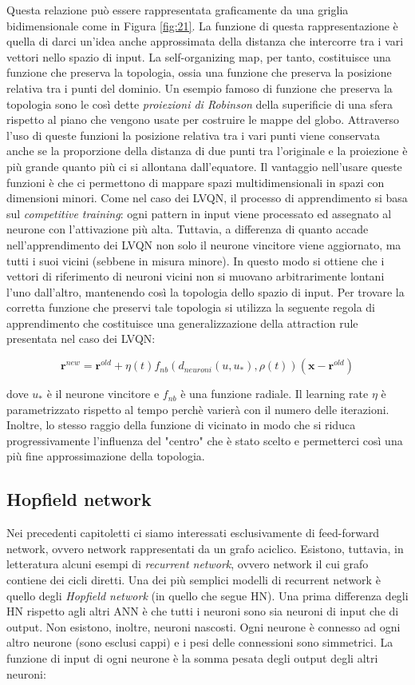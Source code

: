 \documentclass[10pt,a4paper]{article}
\begin{document}
Questa relazione può essere rappresentata graficamente da una griglia bidimensionale come in Figura  \ref{fig:21}. La funzione di questa rappresentazione è quella di darci un'idea anche approssimata della distanza che intercorre tra i vari vettori nello spazio di input. La self-organizing map, per tanto, costituisce una funzione che preserva la topologia, ossia una funzione che preserva la posizione relativa tra i punti del dominio. Un esempio famoso di funzione che preserva la topologia sono le così dette \emph{proiezioni di Robinson} della superificie di una sfera rispetto al piano che vengono usate per costruire le mappe del globo. Attraverso l'uso di queste funzioni la posizione relativa tra i vari punti viene conservata anche se la proporzione della distanza di due punti tra l'originale e la proiezione è più grande quanto più ci si allontana dall'equatore. Il vantaggio nell'usare queste funzioni è che ci permettono di mappare spazi multidimensionali in spazi con dimensioni minori. Come nel caso dei LVQN, il processo di apprendimento si basa sul \emph{competitive training}: ogni pattern in input viene processato ed assegnato al neurone con l'attivazione più alta. Tuttavia, a differenza di quanto accade nell'apprendimento dei LVQN non solo il neurone vincitore viene aggiornato, ma tutti i suoi vicini (sebbene in misura minore). In questo modo si ottiene che i vettori di riferimento di neuroni vicini non si muovano arbitrarimente lontani l'uno dall'altro, mantenendo così la topologia dello spazio di input. Per trovare la corretta funzione che preservi tale topologia si utilizza la seguente regola di apprendimento che costituisce una generalizzazione della attraction rule presentata nel caso dei LVQN:

$$
\mathbf{r}^{new} = \mathbf{r}^{old} + \eta(t)f_{nb}(d_{neuroni}(u,u_*),\rho(t))(\mathbf{x} - \mathbf{r}^{old})
$$

dove $u_*$ è il neurone vincitore e $f_{nb}$ è una funzione radiale. Il learning rate $\eta$ è parametrizzato rispetto al tempo perchè varierà con il numero delle iterazioni. Inoltre, lo stesso raggio della funzione di vicinato in modo che si riduca progressivamente l'influenza del "centro" che è stato scelto e permetterci così una più fine approssimazione della topologia.

\subsection{Hopfield network}

Nei precedenti capitoletti ci siamo interessati esclusivamente di feed-forward network, ovvero network rappresentati da un grafo aciclico. Esistono, tuttavia, in letteratura alcuni esempi di \emph{recurrent network}, ovvero network il cui grafo contiene dei cicli diretti. Una dei più semplici modelli di recurrent network è quello degli \emph{Hopfield network} (in quello che segue HN). Una prima differenza degli HN rispetto agli altri ANN è che tutti i neuroni sono sia neuroni di input che di output. Non esistono, inoltre, neuroni nascosti. Ogni neurone è connesso ad ogni altro neurone (sono esclusi cappi) e i pesi delle connessioni sono simmetrici. La funzione di input di ogni neurone è la somma pesata degli output degli altri neuroni:
\end{document}
